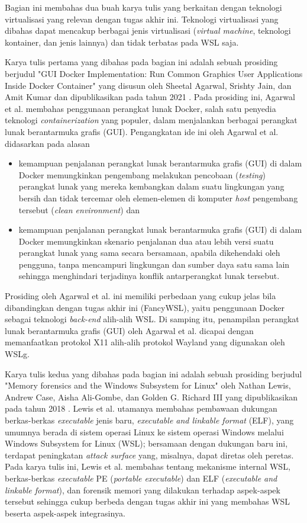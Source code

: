 Bagian ini membahas dua buah karya tulis yang berkaitan dengan teknologi virtualisasi yang relevan dengan tugas akhir ini. Teknologi virtualisasi yang dibahas dapat mencakup berbagai jenis virtualisasi (\textit{virtual machine}, teknologi kontainer, dan jenis lainnya) dan tidak terbatas pada WSL saja.

Karya tulis pertama yang dibahas pada bagian ini adalah sebuah prosiding berjudul "GUI Docker Implementation: Run Common Graphics User Applications Inside Docker Container" yang disusun oleh Sheetal Agarwal, Srishty Jain, dan Amit Kumar dan dipublikasikan pada tahun 2021 \cite{agarwal2021gui}. Pada prosiding ini, Agarwal et al. membahas penggunaan perangkat lunak Docker, salah satu penyedia teknologi \textit{containerization} yang populer, dalam menjalankan berbagai perangkat lunak berantarmuka grafis (GUI). Pengangkatan ide ini oleh Agarwal et al. didasarkan pada alasan
\begin{itemize}
    \item kemampuan penjalanan perangkat lunak berantarmuka grafis (GUI) di dalam Docker memungkinkan pengembang melakukan pencobaan (\textit{testing}) perangkat lunak yang mereka kembangkan dalam suatu lingkungan yang bersih dan tidak tercemar oleh elemen-elemen di komputer \textit{host} pengembang tersebut (\textit{clean environment}) dan
    \item kemampuan penjalanan perangkat lunak berantarmuka grafis (GUI) di dalam Docker memungkinkan skenario penjalanan dua atau lebih versi suatu perangkat lunak yang sama secara bersamaan, apabila dikehendaki oleh pengguna, tanpa mencampuri lingkungan dan sumber daya satu sama lain sehingga menghindari terjadinya konflik antarperangkat lunak tersebut.
\end{itemize}
Prosiding oleh Agarwal et al. ini memiliki perbedaan yang cukup jelas bila dibandingkan dengan tugas akhir ini (FancyWSL), yaitu penggunaan Docker sebagai teknologi \textit{back-end} alih-alih WSL. Di samping itu, penampilan perangkat lunak berantarmuka grafis (GUI) oleh Agarwal et al. dicapai dengan memanfaatkan protokol X11 alih-alih protokol Wayland yang digunakan oleh WSLg.

Karya tulis kedua yang dibahas pada bagian ini adalah sebuah prosiding berjudul "Memory forensics and the Windows Subsystem for Linux" oleh Nathan Lewis, Andrew Case, Aisha Ali-Gombe, dan Golden G. Richard III yang dipublikasikan pada tahun 2018 \cite{lewis2018memory}. Lewis et al. utamanya membahas pembawaan dukungan berkas-berkas \textit{executable} jenis baru, \textit{executable and linkable format} (ELF), yang umumnya berada di sistem operasi Linux ke sistem operasi Windows melalui Windows Subsystem for Linux (WSL); bersamaan dengan dukungan baru ini, terdapat peningkatan \textit{attack surface} yang, misalnya, dapat diretas oleh peretas. Pada karya tulis ini, Lewis et al. membahas tentang mekanisme internal WSL, berkas-berkas \textit{executable} PE (\textit{portable executable}) dan ELF (\textit{executable and linkable format}), dan forensik memori yang dilakukan terhadap aspek-aspek tersebut sehingga cukup berbeda dengan tugas akhir ini yang membahas WSL beserta aspek-aspek integrasinya.

